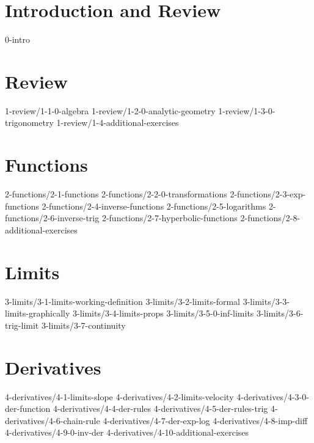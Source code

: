\chapter*{Introduction and Review}
	{0-intro}

\chapter{Review}\label{chap:Review}
	{1-review/1-1-0-algebra}
	{1-review/1-2-0-analytic-geometry}
	{1-review/1-3-0-trigonometry}
	{1-review/1-4-additional-exercises}

\chapter{Functions}\label{chap:Functions}
	{2-functions/2-1-functions}
	{2-functions/2-2-0-transformations}
	{2-functions/2-3-exp-functions}
	{2-functions/2-4-inverse-functions}
	{2-functions/2-5-logarithms}
	{2-functions/2-6-inverse-trig}
	{2-functions/2-7-hyperbolic-functions}
	{2-functions/2-8-additional-exercises}

\chapter{Limits}\label{chap:Limits}
	{3-limits/3-1-limits-working-definition}
	{3-limits/3-2-limits-formal}
	{3-limits/3-3-limits-graphically}
	{3-limits/3-4-limits-props}
	{3-limits/3-5-0-inf-limits}
	{3-limits/3-6-trig-limit}
	{3-limits/3-7-continuity}

\chapter{Derivatives}\label{chap:Derivatives}
	{4-derivatives/4-1-limits-slope}
	{4-derivatives/4-2-limits-velocity}
	{4-derivatives/4-3-0-der-function}
	{4-derivatives/4-4-der-rules}
	{4-derivatives/4-5-der-rules-trig}
	{4-derivatives/4-6-chain-rule}
	{4-derivatives/4-7-der-exp-log}
	{4-derivatives/4-8-imp-diff}
	{4-derivatives/4-9-0-inv-der}
	{4-derivatives/4-10-additional-exercises}

